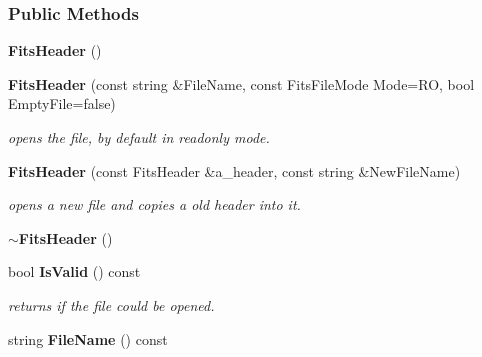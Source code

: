 \subsubsection*{Public Methods}
\begin{CompactItemize}
\item 
{}
{\bf Fits\-Header} ()\label{class_fitsheader_a0}

\item 
{}
{\bf Fits\-Header} (const string \&File\-Name, const Fits\-File\-Mode Mode=RO, bool Empty\-File=false)\label{class_fitsheader_a1}

\begin{CompactList}\small\item\em opens the file, by default in readonly mode.\item\end{CompactList}\item 
{}
{\bf Fits\-Header} (const Fits\-Header \&a\_\-header, const string \&New\-File\-Name)\label{class_fitsheader_a2}

\begin{CompactList}\small\item\em opens a new file and copies a old header into it.\item\end{CompactList}\item 
{}
{\bf $\sim$Fits\-Header} ()\label{class_fitsheader_a3}

\item 
{}
bool {\bf Is\-Valid} () const\label{class_fitsheader_a4}

\begin{CompactList}\small\item\em returns if the file could be opened.\item\end{CompactList}\item 
{}
string {\bf File\-Name} () const\label{class_fitsheader_a5}


\end{CompactItemize}
